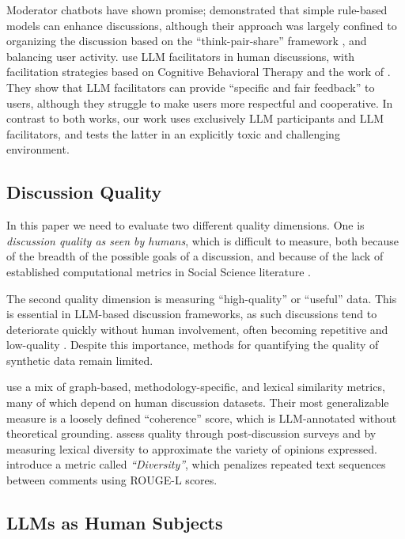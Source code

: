 Moderator chatbots have shown promise; \citet{kim_et_al_chatbot} demonstrated that simple rule-based models can enhance discussions, although their approach was largely confined to organizing the discussion based on the ``think-pair-share'' framework \cite{ahmad_2010_supporting, Navajas2018}, and balancing user activity. \citet{cho-etal-2024-language} use \ac{LLM} facilitators in human discussions, with facilitation strategies based on Cognitive Behavioral Therapy and the work of \citet{rosenberg2015nonviolent}. They show that \ac{LLM} facilitators can provide “specific and fair feedback” to users, although they struggle to make users more respectful and cooperative.  In contrast to both works, our work uses exclusively \ac{LLM} participants and \ac{LLM} facilitators, and tests the latter in an explicitly toxic and challenging environment.


\subsection{Discussion Quality}
\label{ssec:related:quality}

In this paper we need to evaluate two different quality dimensions. One is \emph{discussion quality as seen by humans}, which is difficult to measure, both because of the breadth of the possible goals of a discussion, and because of the lack of established computational metrics in Social Science literature \cite{korre2025evaluation}.

The second quality dimension is measuring “high-quality” or “useful” data. This is essential in \ac{LLM}-based discussion frameworks, as such discussions tend to deteriorate quickly without human involvement, often becoming repetitive and low-quality \citep{ulmer2024}. Despite this importance, methods for quantifying the quality of synthetic data remain limited.

 \citet{balog_2024} use a mix of graph-based, methodology-specific, and lexical similarity metrics, many of which depend on human discussion datasets. Their most generalizable measure is a loosely defined “coherence” score, which is \ac{LLM}-annotated without theoretical grounding. \citet{kim_et_al_chatbot} assess quality through post-discussion surveys and by measuring lexical diversity to approximate the variety of opinions expressed. \citet{ulmer2024}  introduce a metric called \emph{``Diversity''}, which penalizes repeated text sequences between comments using ROUGE-L \citep{lin-2004-rouge} scores.


\subsection{LLMs as Human Subjects}
\label{ssec:related:human-llm}


